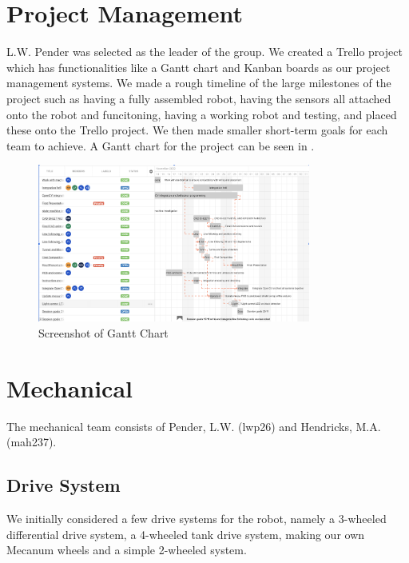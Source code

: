 \documentclass{article}
\begin{document}
\section{Project Management}
\quad L.W. Pender was selected as the leader of the group. We created a Trello project which has functionalities like a Gantt chart and Kanban boards as our project management systems. We made a rough timeline of the large milestones of the project such as having a fully assembled robot, having the sensors all attached onto the robot and funcitoning, having a working robot and testing, and placed these onto the Trello project. We then made smaller short-term goals for each team to achieve. A Gantt chart for the project can be seen in .

\begin{figure}[!h]
    \centering
    \includegraphics[width=0.8\textwidth]{assets/Gantt.png}
    \caption{Screenshot of Gantt Chart}
    \label{fig:gantt}
\end{figure}
    
\section{Mechanical}
\quad The mechanical team consists of Pender, L.W. (lwp26) and Hendricks, M.A. (mah237). 

\subsection{Drive System}
\quad \quad We initially considered a few drive systems for the robot, namely a 3-wheeled differential drive system, a 4-wheeled tank drive system, making our own Mecanum wheels and a simple 2-wheeled system. 
\end{document}
